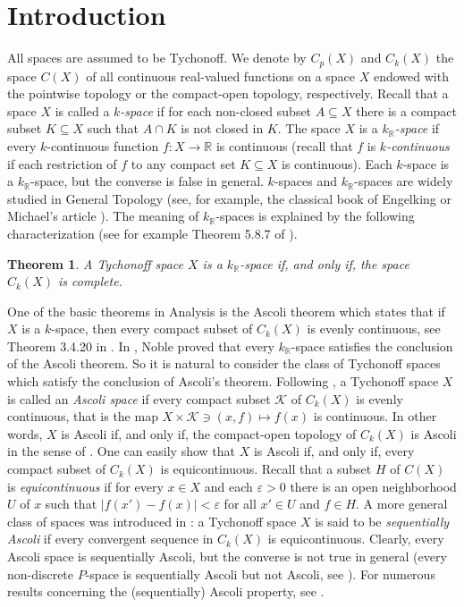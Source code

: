 \documentclass[preprint,11pt]{elsarticle}
\newtheorem{theorem}{Theorem}[section]
\numberwithin{equation}{section}
\numberwithin{theorem}{section}
\newcommand{\e}{\varepsilon}
\newcommand{\IR}{\mathbb{R}}
\newcommand{\KK}{\mathcal{K}}
\newcommand{\CC}{C_k}
\begin{document}
\section{Introduction}


All spaces are assumed to be Tychonoff. We denote by $C_p(X)$ and $\CC(X)$ the space $C(X)$ of all continuous real-valued functions on a space $X$ endowed with the pointwise topology or the compact-open topology, respectively. Recall that a space $X$ is called a {\em $k$-space} if for each non-closed subset $A\subseteq X$ there is a compact subset $K\subseteq X$ such that $A\cap K$ is not closed in $K$. The space $X$ is a {\em $k_\IR$-space} if every $k$-continuous function $f:X\to\IR$ is continuous (recall that $f$ is {\em $k$-continuous} if each restriction of $f$ to any compact set $K\subseteq X$ is continuous). Each $k$-space is a $k_\IR$-space, but the converse is false in general. $k$-spaces and $k_\IR$-spaces are widely studied in General Topology (see, for example, the classical book of Engelking \cite{Eng} or  Michael's article \cite{Mi73}). The meaning of $k_\IR$-spaces is explained by the following characterization (see for example Theorem 5.8.7 of \cite{NaB}).

\begin{theorem} \label{t:kR-classical}
A Tychonoff space $X$ is a $k_\IR$-space if, and only if, the space $\CC(X)$ is complete.
\end{theorem}
\smallskip

One of the basic theorems in Analysis is the Ascoli theorem which states that if $X$ is a $k$-space, then every compact subset of $\CC(X)$ is evenly continuous, see Theorem 3.4.20 in \cite{Eng}. In \cite{Noble}, Noble proved that every $k_\IR$-space satisfies the conclusion of the Ascoli theorem.
So it is natural to consider the class of Tychonoff spaces which satisfy the conclusion of Ascoli's theorem. Following \cite{BG}, a  Tychonoff space $X$ is called an {\em Ascoli space} if every compact subset $\KK$ of $\CC(X)$  is evenly continuous, that is the map $X\times\KK \ni(x,f)\mapsto f(x)$ is continuous. In other words, $X$ is Ascoli if, and only if, the compact-open topology of $\CC(X)$ is Ascoli in the sense of \cite[p.45]{mcoy}. One can easily show that $X$ is Ascoli if, and only if, every compact subset of $\CC(X)$ is equicontinuous. Recall that a subset $H$ of $C(X)$ is {\em equicontinuous} if for every $x\in X$ and each $\e>0$ there is an open neighborhood $U$ of $x$ such that $|f(x')-f(x)|<\e$ for all $x'\in U$ and $f\in H$. A more general class of spaces was introduced in \cite{Gabr:weak-bar-L(X)}: a Tychonoff space $X$ is said to be {\em sequentially Ascoli} if every convergent sequence in $\CC(X)$ is equicontinuous. Clearly, every Ascoli space is sequentially Ascoli, but the converse is not true in general (every non-discrete $P$-space is sequentially Ascoli but not Ascoli, see \cite{Gabr:weak-bar-L(X)}). For numerous results concerning the (sequentially) Ascoli property, see \cite{Gabr-B1,Gab-LF,Gabr:weak-bar-L(X),Gabr-seq-Ascoli}.
\smallskip
\end{document}
